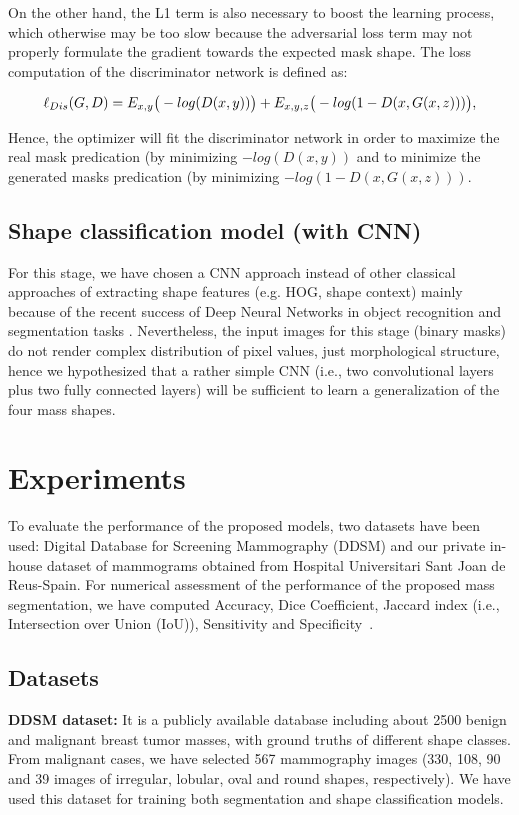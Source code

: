 \documentclass[runningheads,a4paper]{llncs}
\begin{document}
On the other hand, the L1 term is also necessary to boost the learning process, which otherwise may be too slow because the adversarial loss term may not properly formulate the gradient towards the expected mask shape.
The loss computation of the discriminator network is defined as:

\begin{equation}
\small
\ell_{Dis} (G,D) = E_{x,y} \big(-log (D(x,y))\big)+ E_{x,y,z} \big(-log (1-D(x,G(x,z)))\big),
\end{equation}

Hence, the optimizer will fit the discriminator network in order to maximize the real mask predication (by minimizing $-log (D(x, y))$ and to minimize the generated masks predication (by minimizing $-log (1-D(x, G(x, z)))$.


\subsection{Shape classification model (with CNN) }

For this stage, we have chosen a CNN approach instead of other classical approaches of extracting shape features (e.g. HOG, shape context) mainly because of the recent success of Deep Neural Networks in object recognition and segmentation tasks \cite{litjens2017survey}. Nevertheless, the input images for this stage (binary masks) do not render complex distribution of pixel values, just morphological structure, hence we hypothesized that a rather simple CNN (i.e., two convolutional layers plus two fully connected layers) will be sufficient to learn a generalization of the four mass shapes.


\section{Experiments}

To evaluate the performance of the proposed models, two datasets have been used: Digital Database for Screening Mammography (DDSM) \cite{heath2000digital} and our private in-house dataset of mammograms obtained from Hospital Universitari Sant Joan de Reus-Spain. For numerical assessment of the performance of the proposed mass segmentation, we have computed Accuracy, Dice Coefficient, Jaccard index (i.e., Intersection over Union (IoU)), Sensitivity and Specificity~\cite{vacavant2012benchmark}.

\subsection{Datasets}
\textbf{DDSM dataset:} It is a publicly available database including about 2500 benign and malignant breast tumor masses, with ground truths of different shape classes. From malignant cases, we have selected 567 mammography images (330, 108, 90 and 39 images of irregular, lobular, oval and round shapes, respectively). We have used this dataset for training both segmentation and shape classification models.
\end{document}
